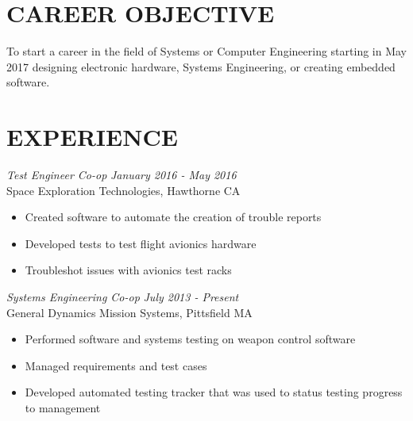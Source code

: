 \documentclass[line,margin]{res}
\begin{document}
\setlength\columnsep{-30pt}
\address{56 South St.}
\address{Drury MA, 01343}
\website{}
 
\begin{resume}
 \setlength\multicolsep{2pt}

\section{CAREER OBJECTIVE}   
	To start a career in the field of Systems or Computer Engineering starting in May 2017 designing electronic hardware, Systems Engineering, or creating embedded software.
 
\section{EXPERIENCE} 
{\sl  Test Engineer Co-op} \hfill {\sl January 2016 - May 2016}\\
	Space Exploration Technologies, Hawthorne CA
	\begin{itemize}  \itemsep -2pt %
		\item Created software to automate the creation of trouble reports
		\item Developed tests to test flight avionics hardware
		\item Troubleshot issues with avionics test racks
	\end{itemize}
	\vspace{-5pt}
{\sl Systems Engineering Co-op} \hfill {\sl July 2013 - Present }\\
	General Dynamics Mission Systems, Pittsfield MA
	\begin{itemize}  \itemsep -2pt %
		\item Performed software and systems testing on weapon control software
		\item Managed requirements and test cases
		\item Developed automated testing tracker that was used to status testing progress to management
	\end{itemize}
 

\end{resume}
\end{document}
